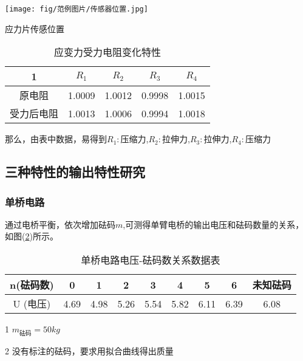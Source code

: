 \documentclass[a4paper,UTF8]{ctexart}
\begin{document}
\begin{table}[!hp]
    \begin{minipage}{200pt}
        \centering
        \texttt{[image: fig/范例图片/传感器位置.jpg]}
        \caption{应力片传感位置}
        \label{fig:5}
    \end{minipage}
    \begin{minipage}{200pt}
        \vspace{20pt}
        \begin{center}
            \begin{tabular}{|c|c|c|c|c|}
                \hline
                1 & $R_1$ & $R_2$ & $R_3$ & $R_4$\\
                \hline 
                原电阻 & 1.0009 & 1.0012 & 0.9998 & 1.0015\\
                \hline
                受力后电阻 & 1.0013 & 1.0006 & 0.9994 & 1.0018\\
                \hline
            \end{tabular}
            \caption{应变力受力电阻变化特性}
            \label{table:1}
        \end{center}
    \end{minipage}        
\end{table}
那么，由表中数据，易得到$R_1:$压缩力,$R_2:$拉伸力,$R_3:$拉伸力,$R_4:$压缩力
\subsection*{三种特性的输出特性研究}
\subsubsection*{单桥电路}
    通过电桥平衡，依次增加砝码$m$,可测得单臂电桥的输出电压和砝码数量的关系，
如图(\ref*{table:2})所示。
\begin{table}[!hp]
    \begin{center}
        \begin{threeparttable}
            \caption{单桥电路电压-砝码数关系数据表}
            \begin{tabular}{|c|c|c|c|c|c|c|c|c|}
                \hline
                n\tnote{1}(砝码数) & 0 & 1 & 2 & 3 & 4 & 5 & 6 & 未知砝码\tnote{2}\\
                \hline
                U (电压) & 4.69 & 4.98 & 5.26 & 5.54 & 5.82 & 6.11 & 6.39 & 6.08\\
                \hline
            \end{tabular}
            \label{table:2}
            \begin{tablenotes}
                \footnotesize
                \item[1] $m_{砝码}=50kg$
                \item[2] 没有标注的砝码，要求用拟合曲线得出质量
            \end{tablenotes}
        \end{threeparttable}
    \end{center}
\end{table}
\end{document}
